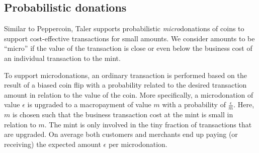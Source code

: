 \documentclass{llncs}
\begin{document}
%
%
%


\subsection{Probabilistic donations}

Similar to Peppercoin, Taler supports probabilistic {\em micro}donations of coins to
support cost-effective transactions for small amounts.  We consider
amounts to be ``micro'' if the value of the transaction is close or
even below the business cost of an individual transaction to the mint.

To support microdonations, an ordinary transaction is performed based
on the result of a biased coin flip with a probability related to the
desired transaction amount in relation to the value of the coin.  More
specifically, a microdonation of value $\epsilon$ is upgraded to a
macropayment of value $m$ with a probability of $\frac{\epsilon}{m}$.
Here, $m$ is chosen such that the business transaction cost at the
mint is small in relation to $m$.  The mint is only involved in the
tiny fraction of transactions that are upgraded.  On average both
customers and merchants end up paying (or receiving) the expected
amount $\epsilon$ per microdonation.
\end{document}
